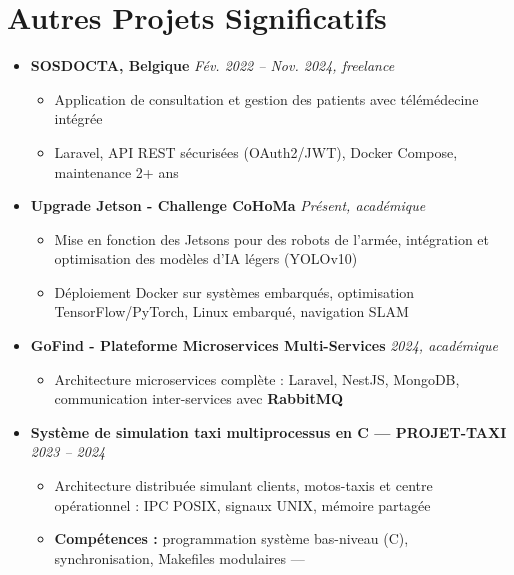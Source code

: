 \documentclass[a4paper,11pt]{article}
\begin{document}
\section{Autres Projets Significatifs}
\begin{itemize}[leftmargin=*, label={}]

    \item \textbf{SOSDOCTA, Belgique} \hfill \textit{Fév. 2022 -- Nov. 2024, freelance}
    \vspace{-2pt}
    \begin{itemize}[leftmargin=0.4cm, nosep, label=\tiny$\bullet$]
        \item \small{Application de consultation et gestion des patients avec télémédecine intégrée}
        \item \small{Laravel, API REST sécurisées (OAuth2/JWT), Docker Compose, maintenance 2+ ans}
    \end{itemize}
    \vspace{2pt}

    \item \textbf{Upgrade Jetson - Challenge CoHoMa} \hfill \textit{Présent, académique}
    \vspace{-2pt}
    \begin{itemize}[leftmargin=0.4cm, nosep, label=\tiny$\bullet$]
        \item \small{Mise en fonction des Jetsons pour des robots de l'armée, intégration et optimisation des modèles d'IA légers (YOLOv10)}
        \item \small{Déploiement Docker sur systèmes embarqués, optimisation TensorFlow/PyTorch, Linux embarqué, navigation SLAM}
    \end{itemize}
    \vspace{2pt}

    \item \textbf{GoFind - Plateforme Microservices Multi-Services} \hfill \textit{2024, académique}
    \vspace{-2pt}
    \begin{itemize}[leftmargin=0.4cm, nosep, label=\tiny$\bullet$]
        \item \small{Architecture microservices complète : Laravel, NestJS, MongoDB, communication inter-services avec \textbf{RabbitMQ}}
    \end{itemize}
    \vspace{2pt}

    \item \textbf{Système de simulation taxi multiprocessus en C — PROJET-TAXI} \hfill \textit{2023 -- 2024}
    \vspace{-2pt}
    \begin{itemize}[leftmargin=0.4cm, nosep, label=\tiny$\bullet$]
        \item \small{Architecture distribuée simulant clients, motos-taxis et centre opérationnel : IPC POSIX, signaux UNIX, mémoire partagée}
        \item \small{\textbf{Compétences :} programmation système bas-niveau (C), synchronisation, Makefiles modulaires — \href{https://github.com/Nameless0l/PROJET-TAXI}{\faGithub}}
    \end{itemize}


\end{itemize}
\end{document}
